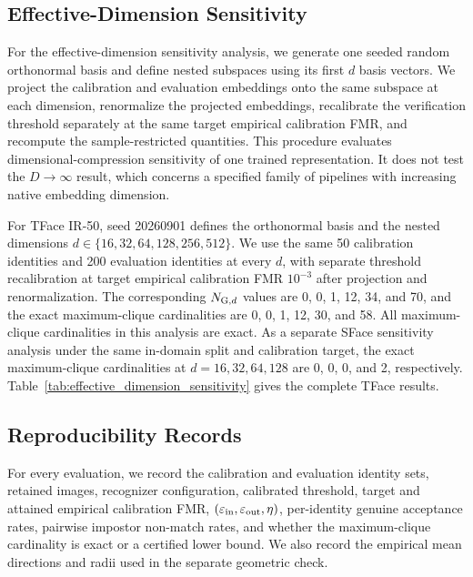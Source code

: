 \documentclass[journal]{IEEEtran}
\begin{document}
\begin{bibunit}
 




\subsection{Effective-Dimension Sensitivity}

For the effective-dimension sensitivity analysis, we generate one seeded random orthonormal basis and define nested subspaces using its first $d$ basis vectors. We project the calibration and evaluation embeddings onto the same subspace at each dimension, renormalize the projected embeddings, recalibrate the verification threshold separately at the same target empirical calibration FMR, and recompute the sample-restricted
quantities. This procedure evaluates dimensional-compression sensitivity of one trained representation. It does not test the $D\to\infty$ result, which concerns a specified family of pipelines with increasing native embedding dimension.

For TFace IR-50, seed 20260901 defines the orthonormal basis and the nested dimensions $d\in\{16,32,64,128,256,512\}$. We use the same 50 calibration identities and 200 evaluation identities at every $d$, with separate threshold recalibration at target empirical calibration FMR $10^{-3}$ after projection and renormalization. The corresponding $N_{{\rm G},d}$ values are 0, 0, 1, 12, 34, and 70, and the exact maximum-clique cardinalities are 0, 0, 1, 12, 30, and 58. All maximum-clique cardinalities in this analysis are exact. As a separate SFace sensitivity analysis under the same in-domain split and calibration target, the exact maximum-clique cardinalities at $d=16,32,64,128$ are 0, 0, 0, and 2, respectively. Table~\ref{tab:effective_dimension_sensitivity} gives the complete TFace results.






\subsection{Reproducibility Records}

For every evaluation, we record the calibration and evaluation identity sets, retained images, recognizer configuration, calibrated threshold, target and attained empirical calibration FMR, $(\varepsilon_{\rm in},\varepsilon_{\rm out},\eta)$, per-identity genuine acceptance rates, pairwise impostor non-match rates, and whether the maximum-clique cardinality is exact or a certified lower bound. We also record the empirical mean directions and radii used in the separate geometric check.



\end{bibunit}
\end{document}
